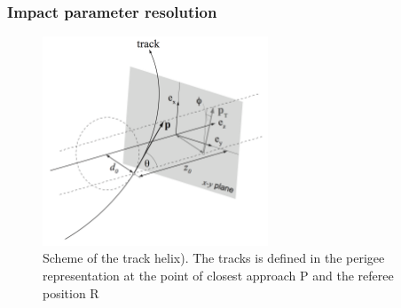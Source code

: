 \subsubsection{Impact parameter resolution}
\begin{figure}
\center
\includegraphics[width=0.6\textwidth]{Images/tracking_det/ImpactParameters.png}
\caption{Scheme of the track helix). The tracks is defined in the perigee representation at the point of closest approach P and the referee position R}
\label{pic:impact_param}
\end{figure}

